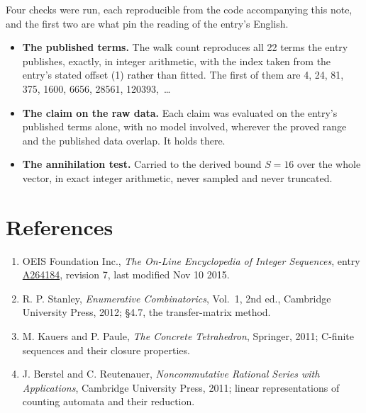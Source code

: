 \documentclass[11pt]{article}
\theoremstyle{definition}
\begin{document}
Four checks were run, each reproducible from the code accompanying this note, and the first two are what pin the reading of the entry's English.

\begin{itemize}

\item {\bfseries The published terms.} The walk count reproduces all 22 terms the entry publishes, exactly, in integer arithmetic, with the index taken from the entry's stated offset (1) rather than fitted. The first of them are 4, 24, 81, 375, 1600, 6656, 28561, 120393,~\dots

\item {\bfseries The claim on the raw data.} Each claim was evaluated on the entry's published terms alone, with no model involved, wherever the proved range and the published data overlap. It holds there.

\item {\bfseries The annihilation test.} Carried to the derived bound $S = 16$ over the whole vector, in exact integer arithmetic, never sampled and never truncated.

\end{itemize}

\section{References}

\begin{enumerate}

\item OEIS Foundation Inc., \emph{The On-Line Encyclopedia of Integer Sequences}, entry \href{https://oeis.org/A264184}{A264184}, revision 7, last modified Nov 10 2015.

\item R. P. Stanley, \emph{Enumerative Combinatorics}, Vol.~1, 2nd ed., Cambridge University Press, 2012; \S4.7, the transfer-matrix method.

\item M. Kauers and P. Paule, \emph{The Concrete Tetrahedron}, Springer, 2011; C-finite sequences and their closure properties.

\item J. Berstel and C. Reutenauer, \emph{Noncommutative Rational Series with Applications}, Cambridge University Press, 2011; linear representations of counting automata and their reduction.

\end{enumerate}
\end{document}
